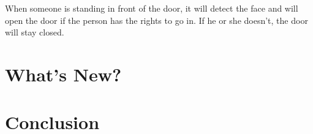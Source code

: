 \documentclass[14pt, a4paper]{extarticle}
\begin{document}
	
	When someone is standing in front of the door, it will detect the face and will open the door if the person has the rights to go in. If he or she doesn't, the door will stay closed.
	
	\newpage
	\section{What's New?}
	
	\newpage
	\section{Conclusion}
	
	\newpage
	
	
	
	
\end{document}
